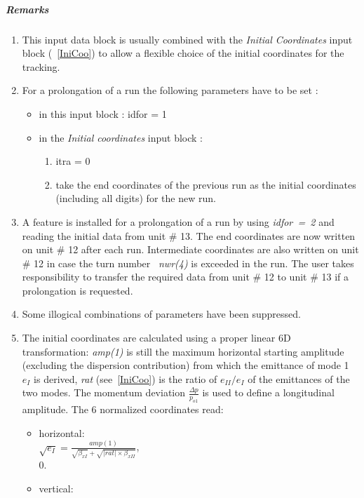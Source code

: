 \documentclass[a4paper,11pt]{report}
\begin{document}
\subparagraph{Remarks}
\begin{enumerate}
\item This input data block is usually combined with the {\em Initial
    Coordinates} \/input block (~\ref{IniCoo}) to allow a flexible
  choice of the initial coordinates for the tracking.
\item For a prolongation of a run the following parameters have to be
  set :
\begin{itemize}
\item in this input block : idfor = 1
\item in the {\em Initial coordinates} \/input block :
\begin{enumerate}
\item itra = 0
\item take the end coordinates of the previous run as the initial
  coordinates (including all digits) for the new run.
\end{enumerate}
\end{itemize}
\item A feature is installed for a prolongation of a run by using
  \mbox{\em idfor = 2} \/and 
  reading the initial data from unit \# 13. The end coordinates are
  now written on unit \# 12 after each run. Intermediate coordinates
  are also written on unit \# 12 in case the turn number \mbox{\em
    nwr(4)} \/is exceeded in the run. The user takes responsibility to
  transfer the required data from unit \# 12 to unit \# 13 if a
  prolongation is requested.
\item Some illogical combinations of parameters have been suppressed.
\item The initial coordinates are calculated using a proper linear 6D
  transformation: {\em amp(1)} \/is still the maximum horizontal
  starting amplitude (excluding the dispersion contribution) from
  which the emittance of mode 1 $e_I$ is derived, {\em rat}
  \/(see~\ref{IniCoo}) is the ratio of $e_{II}/e_I$ of the emittances
  of the two modes. The momentum deviation $\frac{\Delta p}{p_{o1}}$ is used to
  define a longitudinal amplitude. The 6 normalized coordinates read:
\begin{itemize}
\item horizontal:\\

  $\sqrt{e_I}=\frac{amp(1)}
  {\sqrt{\beta_{xI}}+\sqrt{\left|rat\right|\times\beta_{xII}}}$,\\

  $0.$

\item vertical: \\


\end{itemize}
\end{enumerate}
\end{document}

